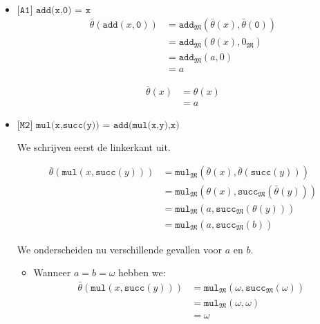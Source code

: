 \documentclass[a4paper,11pt]{article}
\begin{document}
\begin{itemize}

\item{$\texttt{[A1] add(x,0) = x}$}
\begin{align*}
\bar \theta(\texttt{add}(x,\texttt{0})) &= \texttt{add}_{\mathfrak{M}}(\bar \theta(x), \bar \theta(\texttt{0})) \\
                                        &= \texttt{add}_{\mathfrak{M}}(\theta(x), 0_{\mathfrak{M}}) \\
                                        &= \texttt{add}_{\mathfrak{M}}(a, 0) \\
                                        &= a
\end{align*}

\begin{align*}
\bar \theta(x) &= \theta(x) \\
               &= a
\end{align*}

\item{$\texttt{[M2] mul(x,succ(y)) = add(mul(x,y),x)}$}

We schrijven eerst de linkerkant uit.

\begin{align*}
\bar \theta(\texttt{mul}(x,\texttt{succ}(y))) &= \texttt{mul}_{\mathfrak{M}}(\bar \theta(x), \bar \theta(\texttt{succ}(y))) \\
                                              &= \texttt{mul}_{\mathfrak{M}}(\theta(x), \texttt{succ}_{\mathfrak{M}}(\bar \theta(y))) \\
                                              &= \texttt{mul}_{\mathfrak{M}}(a, \texttt{succ}_{\mathfrak{M}}(\theta(y))) \\
                                              &= \texttt{mul}_{\mathfrak{M}}(a, \texttt{succ}_{\mathfrak{M}}(b))
\end{align*}

We onderscheiden nu verschillende gevallen voor $a$ en $b$.

\begin{itemize}

\item
Wanneer $a = b = \omega$ hebben we:
\begin{align*}
\bar \theta(\texttt{mul}(x,\texttt{succ}(y))) &= \texttt{mul}_{\mathfrak{M}}(\omega, \texttt{succ}_{\mathfrak{M}}(\omega)) \\
                                              &= \texttt{mul}_{\mathfrak{M}}(\omega, \omega) \\
                                              &= \omega
\end{align*}


\end{itemize}
\end{itemize}
\end{document}
